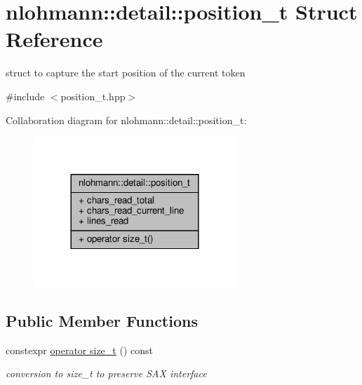 \hypertarget{structnlohmann_1_1detail_1_1position__t}{}\section{nlohmann\+:\+:detail\+:\+:position\+\_\+t Struct Reference}
\label{structnlohmann_1_1detail_1_1position__t}


struct to capture the start position of the current token  




{\ttfamily \#include $<$position\+\_\+t.\+hpp$>$}



Collaboration diagram for nlohmann\+:\+:detail\+:\+:position\+\_\+t\+:\nopagebreak
\begin{figure}[H]
\begin{center}
\leavevmode
\includegraphics[width=216pt]{structnlohmann_1_1detail_1_1position__t__coll__graph}
\end{center}
\end{figure}
\subsection*{Public Member Functions}
\begin{DoxyCompactItemize}
\item 
constexpr \hyperlink{structnlohmann_1_1detail_1_1position__t_a19ae0c646ae232d805c2480b3c410ffa}{operator size\+\_\+t} () const 
\begin{DoxyCompactList}\small\item\em conversion to size\+\_\+t to preserve S\+AX interface \end{DoxyCompactList}\end{DoxyCompactItemize}
